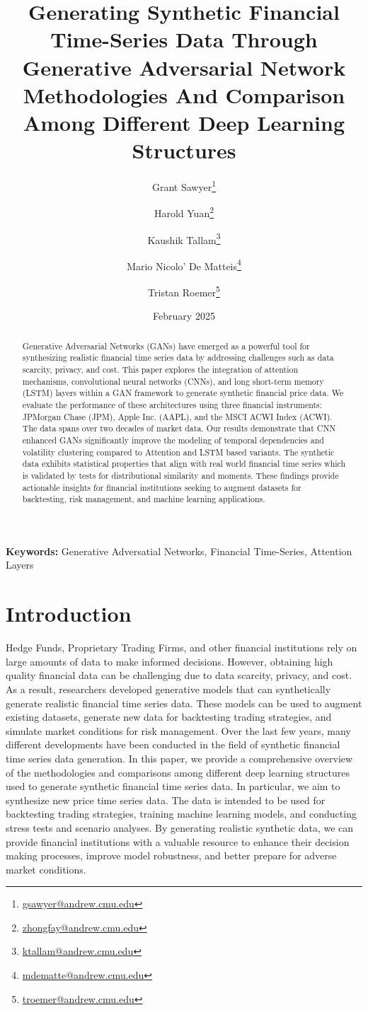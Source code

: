 \documentclass{article}
\title{Generating Synthetic Financial Time-Series Data Through Generative Adversarial Network\\[0.5em] \large Methodologies And Comparison Among Different Deep Learning Structures}
\author[1]{Grant Sawyer\thanks{\href{mailto:gsawyer@andrew.cmu.edu}{gsawyer@andrew.cmu.edu}}}
\author[1]{Harold Yuan\thanks{\href{mailto:zhongfay@andrew.cmu.edu}{zhongfay@andrew.cmu.edu}}}
\author[1]{Kaushik Tallam\thanks{\href{mailto:ktallam@andrew.cmu.edu}{ktallam@andrew.cmu.edu}}}
\author[1]{Mario Nicolo' De Matteis\thanks{\href{mailto:mdematte@andrew.cmu.edu}{mdematte@andrew.cmu.edu}}}
\author[1]{Tristan Roemer\thanks{\href{mailto:troemer@andrew.cmu.edu}{troemer@andrew.cmu.edu}}}
\affil[1]{Carnegie Mellon University, MSCF, New York, USA}
\date{February 2025}
\begin{document}
\maketitle

\begin{abstract}
    Generative Adversarial Networks (GANs) have emerged as a powerful tool for synthesizing realistic financial time series data by addressing challenges such as data scarcity, privacy, and cost. This paper explores the integration of attention mechanisms, convolutional neural networks (CNNs), and long short-term memory (LSTM) layers within a GAN framework to generate synthetic financial price data. We evaluate the performance of these architectures using three financial instruments: JPMorgan Chase (JPM), Apple Inc. (AAPL), and the MSCI ACWI Index (ACWI). The data spans over two decades of market data. Our results demonstrate that CNN enhanced GANs significantly improve the modeling of temporal dependencies and volatility clustering compared to Attention and LSTM based variants. The synthetic data exhibits statistical properties that align with real world financial time series which is validated by tests for distributional similarity and moments. These findings provide actionable insights for financial institutions seeking to augment datasets for backtesting, risk management, and machine learning applications.
\end{abstract}

\doublespacing

\noindent \textbf{Keywords:} Generative Adversatial Networks, Financial Time-Series, Attention Layers

\section{Introduction}

Hedge Funds, Proprietary Trading Firms, and other financial institutions rely on large amounts of data to make informed decisions. However, obtaining high quality financial data can be challenging due to data scarcity, privacy, and cost. As a result, researchers developed generative models that can synthetically generate realistic financial time series data. These models can be used to augment existing datasets, generate new data for backtesting trading strategies, and simulate market conditions for risk management. Over the last few years, many different developments have been conducted in the field of synthetic financial time series data generation. In this paper, we provide a comprehensive overview of the methodologies and comparisons among different deep learning structures used to generate synthetic financial time series data. In particular, we aim to synthesize new price time series data. The data is intended to be used for  backtesting trading strategies, training machine learning models, and conducting stress tests and scenario analyses. By generating realistic synthetic data, we can provide financial institutions with a valuable resource to enhance their decision making processes, improve model robustness, and better prepare for adverse market conditions.
\end{document}
